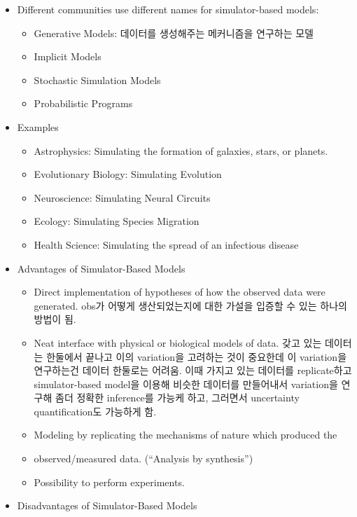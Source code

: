 \documentclass[
]{book}
\providecommand{\tightlist}{%
  \setlength{\itemsep}{0pt}\setlength{\parskip}{0pt}}
\begin{document}
\begin{itemize}
\tightlist
\item
  Different communities use different names for simulator-based models:

  \begin{itemize}
  \tightlist
  \item
    Generative Models: 데이터를 생성해주는 메커니즘을 연구하는 모델
  \item
    Implicit Models
  \item
    Stochastic Simulation Models
  \item
    Probabilistic Programs
  \end{itemize}
\item
  Examples

  \begin{itemize}
  \tightlist
  \item
    Astrophysics: Simulating the formation of galaxies, stars, or planets.
  \item
    Evolutionary Biology: Simulating Evolution
  \item
    Neuroscience: Simulating Neural Circuits
  \item
    Ecology: Simulating Species Migration
  \item
    Health Science: Simulating the spread of an infectious disease
  \end{itemize}
\item
  Advantages of Simulator-Based Models

  \begin{itemize}
  \tightlist
  \item
    Direct implementation of hypotheses of how the observed data were generated. obs가 어떻게 생산되었는지에 대한 가설을 입증할 수 있는 하나의 방법이 됨.
  \item
    Neat interface with physical or biological models of data. 갖고 있는 데이터는 한둘에서 끝나고 이의 variation을 고려하는 것이 중요한데 이 variation을 연구하는건 데이터 한둘로는 어려움. 이때 가지고 있는 데이터를 replicate하고 simulator-based model을 이용해 비슷한 데이터를 만들어내서 variation을 연구해 좀더 정확한 inference를 가능케 하고, 그러면서 uncertainty quantification도 가능하게 함.\\
  \item
    Modeling by replicating the mechanisms of nature which produced the
  \item
    observed/measured data. (``Analysis by synthesis'')
  \item
    Possibility to perform experiments.
  \end{itemize}
\item
  Disadvantages of Simulator-Based Models


\end{itemize}
\end{document}
